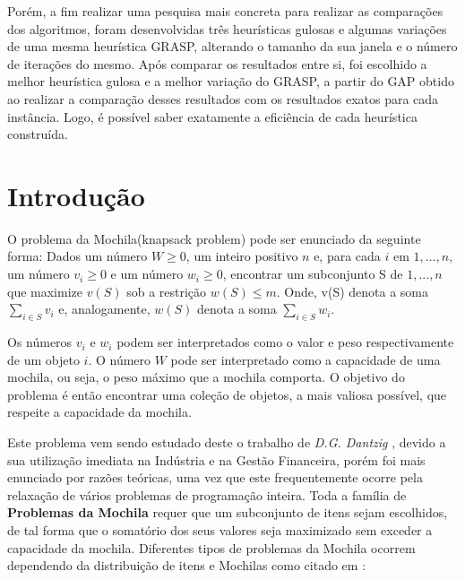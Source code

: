 \documentclass[a4paper, 12pt]{article}
\begin{document}
Porém, a fim realizar uma pesquisa mais concreta para realizar as comparações dos algoritmos,
foram desenvolvidas três heurísticas gulosas e algumas variações de uma mesma heurística GRASP, alterando
o tamanho da sua janela e o número de iterações do mesmo. Após comparar
os resultados entre si, foi escolhido a melhor heurística gulosa e a melhor variação do GRASP, a partir do GAP
obtido ao realizar a comparação desses resultados com os resultados exatos para cada instância. Logo, é possível saber
exatamente a eficiência de cada heurística construída.

\clearpage

\section{Introdução}

O problema da Mochila(knapsack problem) pode ser enunciado da seguinte forma:
Dados um número $W \geq 0$, um inteiro positivo $n$ e, para cada $i$ em ${1, . . . , n}$, um
número $v_i \geq 0$ e um número $w_i \geq 0$, encontrar um subconjunto S de ${1, . . . , n}$ que
maximize $v(S)$ sob a restrição $w(S)\leq m$. Onde, v(S) denota a soma $\sum_{ i \in S} v_i$ e, 
analogamente, $w(S)$ denota a soma $\sum_{ i \in S} w_i$.

Os números $v_i$ e $w_i$ podem ser interpretados como o valor e peso respectivamente
de um objeto $i$. O número $W$ pode ser interpretado como a capacidade de uma
mochila, ou seja, o peso máximo que a mochila comporta. O objetivo do problema
é então encontrar uma coleção de objetos, a mais valiosa possível, que respeite a
capacidade da mochila.

Este problema vem sendo estudado deste o trabalho de \textit{D.G. Dantzig} \cite{pisinger1995algorithms}, devido a
sua utilização imediata na Indústria e na Gestão Financeira, porém foi mais enunciado por razões teóricas, 
uma vez que este frequentemente ocorre pela relaxação de vários problemas de programação inteira. 
Toda a família de \textbf{Problemas da Mochila} requer que um subconjunto de itens sejam escolhidos, de tal forma que o
somatório dos seus valores seja maximizado sem exceder a capacidade da mochila.
Diferentes tipos de problemas da Mochila ocorrem dependendo da distribuição de
itens e Mochilas como citado em \cite{pisinger1995algorithms}:
\end{document}
